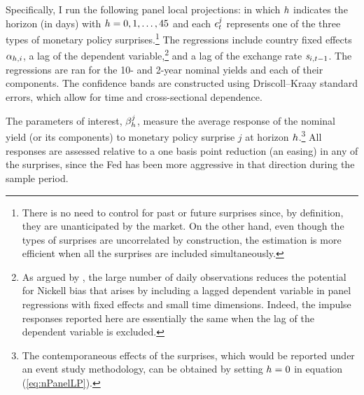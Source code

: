 {Specifically, I run the following panel local projections:
\noindent in which 
\(h\) indicates the horizon (in days) with \(h = 0, 1, \ldots, 45\) and each \(\epsilon^{j}_{t}\) represents one of the three types of monetary policy surprises.\footnote{ There is no need to control for past or future surprises since, by definition, they are unanticipated by the market. On the other hand, even though the types of surprises are uncorrelated by construction, the estimation is more efficient when all the surprises are included simultaneously.} %
The regressions include country fixed effects \(\alpha_{h,i}\), a lag of the dependent variable,\footnote{ As argued by \cite{HofmannShimShin:2019}, the large number of daily observations reduces the potential for Nickell bias that arises by including a lagged dependent variable in panel regressions with fixed effects and small time dimensions. Indeed, the impulse responses reported here are essentially the same when the lag of the dependent variable is excluded.} %
and a lag of the exchange rate \(\mathit{s}_{i,{t-1}}\). %
The regressions are ran for the 10- and 2-year nominal yields and each of their components.
The confidence bands are constructed using Driscoll--Kraay standard errors, which allow for time and cross-sectional dependence.

The parameters of interest, \(\beta^{j}_{h}\), measure the average response of the nominal yield (or its components) to monetary policy surprise \(j\) at horizon \(h\).\footnote{ The contemporaneous effects of the surprises, which would be reported under an event study methodology, can be obtained by setting \(h = 0\) in equation (\ref{eq:nPanelLP}).}
All responses are assessed relative to a one basis point reduction (an easing) in any of the surprises, since the Fed has been more aggressive in that direction during the sample period.

}
